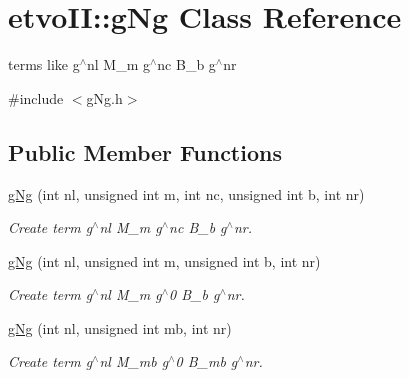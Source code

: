 \hypertarget{classetvo_i_i_1_1g_ng}{}\section{etvo\+II\+:\+:g\+Ng Class Reference}
\label{classetvo_i_i_1_1g_ng}


terms like g$^\wedge$nl M\+\_\+m g$^\wedge$nc B\+\_\+b g$^\wedge$nr  




{\ttfamily \#include $<$g\+Ng.\+h$>$}

\subsection*{Public Member Functions}
\begin{DoxyCompactItemize}
\item 
\mbox{\label{classetvo_i_i_1_1g_ng_a7b817eff213cb6980af56f6f0398d477}} 
\mbox{\hyperlink{classetvo_i_i_1_1g_ng_a7b817eff213cb6980af56f6f0398d477}{g\+Ng}} (int nl, unsigned int m, int nc, unsigned int b, int nr)
\begin{DoxyCompactList}\small\item\em Create term g$^\wedge$nl M\+\_\+m g$^\wedge$nc B\+\_\+b g$^\wedge$nr. \end{DoxyCompactList}\item 
\mbox{\label{classetvo_i_i_1_1g_ng_ad3f911b4815d6b2d6cfed7769ceccc15}} 
\mbox{\hyperlink{classetvo_i_i_1_1g_ng_ad3f911b4815d6b2d6cfed7769ceccc15}{g\+Ng}} (int nl, unsigned int m, unsigned int b, int nr)
\begin{DoxyCompactList}\small\item\em Create term g$^\wedge$nl M\+\_\+m g$^\wedge$0 B\+\_\+b g$^\wedge$nr. \end{DoxyCompactList}\item 
\mbox{\label{classetvo_i_i_1_1g_ng_aa9a2ce82c40a4567bfca54270fd4a3d8}} 
\mbox{\hyperlink{classetvo_i_i_1_1g_ng_aa9a2ce82c40a4567bfca54270fd4a3d8}{g\+Ng}} (int nl, unsigned int mb, int nr)
\begin{DoxyCompactList}\small\item\em Create term g$^\wedge$nl M\+\_\+mb g$^\wedge$0 B\+\_\+mb g$^\wedge$nr. \end{DoxyCompactList}\item 

\end{DoxyCompactItemize}
